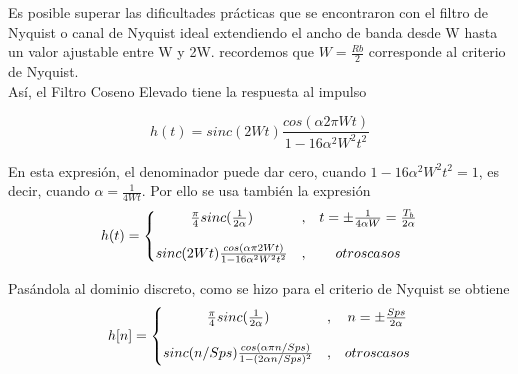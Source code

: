 Es posible superar las dificultades prácticas que se encontraron con el filtro de Nyquist o canal de Nyquist ideal extendiendo el ancho de banda desde W hasta un valor ajustable entre W y 2W. recordemos que $W = \frac{Rb}{2}$ corresponde al criterio de Nyquist. \\
Así, el Filtro Coseno Elevado tiene la respuesta al impulso

\begin{equation} \label{capcuatro_diesisiete}
	 h(t) = sinc(2Wt)\dfrac{cos(\alpha2\pi Wt)}{1-16\alpha ^{2}W^{2}t^{2}}
\end{equation}

En esta expresión, el denominador puede dar cero, cuando $1-16 \alpha^{2}W^{2}t^2=1$, es decir, cuando $\alpha = \frac{1}{4Wt}$. Por ello se usa también la expresión \\

\begin{equation} \label{capcuatro_diesiocho}
h(t)=\left \{ \begin{matrix}
\frac{\pi}{4}  sinc(\frac{1}{2 \alpha}) &, & t=\pm \frac{1}{4 \alpha W}=\frac{T_b}{2 \alpha} \\
\\ 
sinc(2Wt) \frac{cos(\alpha \pi 2Wt)}{1-16 \alpha^2 W^2 t^2} & , & otros \space casos 
\end{matrix} \right.
\end{equation}


Pasándola al dominio discreto, como se hizo para el criterio de Nyquist se obtiene \\

\begin{equation} \label{capcuatro_diesinueve}
h[n]=\left \{ \begin{matrix}
\frac{\pi}{4} sinc(\frac{1}{2 \alpha}) &, & n=\pm \frac{Sps}{2 \alpha} \\
\\ 
sinc(n/Sps) \frac{cos(\alpha \pi n/Sps)}{1-(2 \alpha n/Sps)^2} & , & otros \space casos 
\end{matrix} \right.
\end{equation}

